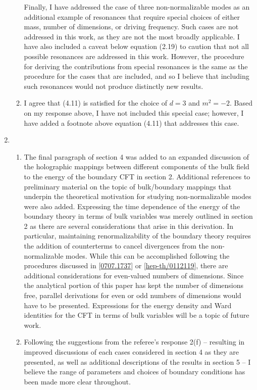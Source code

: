 \documentclass[11pt,letterpaper]{article}
\begin{document}
\begin{enumerate}
\begin{enumerate}
        Finally, I have addressed the case of three non-normalizable modes as an additional example of resonances that require special choices of either mass, number of dimensions, or driving frequency. Such cases are not addressed in this work, as they are not the most broadly applicable. I have also included a caveat below equation (2.19) to caution that not all possible resonances are addressed in this work. However, the procedure for deriving the contributions from special resonances is the same as the procedure for the cases that are included, and so I believe that including such resonances would not produce distinctly new results.
        \item I agree that (4.11) is satisfied for the choice of $d=3$ and $m^2 = -2$. Based on my response above, I have not included this special case; however, I have added a footnote above equation (4.11)  that addresses this case.
    \end{enumerate}
    \item %
    \begin{enumerate}
        \item The final paragraph of section 4 was added to an expanded discussion of the holographic mappings between different components of the bulk field to the energy of the boundary CFT in section 2. Additional references to preliminary material on the topic of bulk/boundary mappings that underpin the theoretical motivation for studying non-normalizable modes were also added.
        Expressing the time dependence of the energy of the boundary theory in terms of bulk variables was merely outlined in section 2 as there are several considerations that arise in this derivation. In particular, maintaining renormalizability of the boundary theory requires the addition of counterterms to cancel divergences from the non-normalizable modes. While this can be accomplished following the procedures discussed in [\href{https://arxiv.org/abs/0707.1737}{0707.1737}] or [\href{https://arxiv.org/abs/hep-th/0112119}{hep-th/0112119}], there are additional considerations for even-valued numbers of dimensions. Since the analytical portion of this paper has kept the number of dimensions free, parallel derivations for even or odd numbers of dimensions would have to be presented. Expressions for the energy density and Ward identities for the CFT in terms of bulk variables will be a topic of future work.
        \item Following the suggestions from the referee's response 2(f) -- resulting in improved discussions of each cases considered in section 4 as they are presented, as well as additional descriptions of the results in section 5 -- I believe the range of parameters and choices of boundary conditions has been made more clear throughout.

\end{enumerate}
\end{enumerate}
\end{document}
